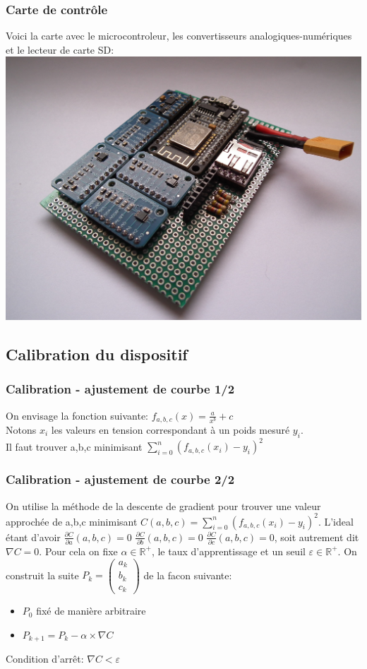 \begin{frame}
\frametitle{Carte de contrôle}
Voici la carte avec le microcontroleur, les convertisseurs analogiques-numériques et le lecteur de carte SD:
\includegraphics[width=\textwidth]{./figures/carte_00.jpg}

\end{frame}
\subsection{Calibration du dispositif}
\begin{frame}
\frametitle{Calibration - ajustement de courbe 1/2}
On envisage la fonction suivante: $f_{a,b,c}(x) = \frac{a}{x^b}+c$\\
Notons $x_i$ les valeurs en tension correspondant à un poids mesuré $y_i$.\\
Il faut trouver a,b,c minimisant $ \sum_{i=0}^{n} (f_{a,b,c}(x_i)-y_i)^2$
\end{frame}

\begin{frame}
\frametitle{Calibration - ajustement de courbe 2/2}
On utilise la méthode de la descente de gradient pour trouver une valeur approchée de a,b,c minimisant $C(a,b,c)=\sum_{i=0}^{n} (f_{a,b,c}(x_i)-y_i)^2$.
L'ideal étant d'avoir $\frac{\partial C}{\partial a} (a,b,c) = 0$ $\frac{\partial C}{\partial b} (a,b,c) = 0$ $\frac{\partial C}{\partial c} (a,b,c) = 0$, soit autrement dit $\nabla C = 0$. Pour cela on fixe $\alpha \in \mathbb{R}^+$, le taux d'apprentissage et un seuil $\varepsilon \in \mathbb{R}^+$. On construit la suite $P_k=\begin{pmatrix} a_k \\ b_k \\ c_k \end{pmatrix}$ de la facon suivante:
\begin{itemize}
\item $P_0$ fixé de manière arbitraire
\item $P_{k+1}= P_{k} - \alpha \times \nabla C$
\end{itemize}
Condition d'arrêt: $\nabla C < \varepsilon$
\end{frame}

